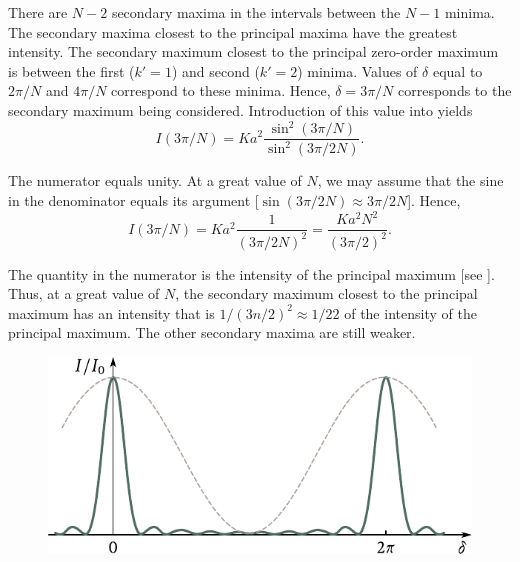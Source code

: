 \noindent
There are $N-2$ secondary maxima in the intervals between the $N-1$ minima.
The secondary maxima closest to the principal maxima have the greatest intensity.
The secondary maximum closest to the principal zero-order maximum is between the first ($k'=1$) and second ($k'=2$) minima.
Values of $\delta$ equal to $2\pi/N$ and $4\pi/N$ correspond to these minima.
Hence, $\delta=3\pi/N$ corresponds to the secondary maximum being considered.
Introduction of this value into  yields
\begin{equation*}
    I(3\pi/N) = K a^2 \frac{ \sin^2(3\pi/N) }{ \sin^2(3\pi/2N) }.
\end{equation*}

\noindent
The numerator equals unity.
At a great value of $N$, we may assume that the sine in the denominator equals its argument [$\sin(3\pi/2N)\approx 3\pi/2N$].
Hence,
\begin{equation*}
    I(3\pi/N) = K a^2 \frac{1}{ (3\pi/2N)^2 } = \frac{K a^2 N^2}{(3\pi/2)^2}.
\end{equation*}

\noindent
The quantity in the numerator is the intensity of the principal maximum [see ].
Thus, at a great value of $N$, the secondary maximum closest to the principal maximum has an intensity that is $1/(3n/2)^2\approx 1/22$ of the intensity of the principal maximum.
The other secondary maxima are still weaker.

\begin{figure}[!htb]
	\begin{center}
		\includegraphics[scale=0.95]{figures/ch_17/fig_17_18.pdf}
		\caption[]{}
		\label{fig:17_18}
	\end{center}
	\vspace{-0.85cm}
\end{figure}

